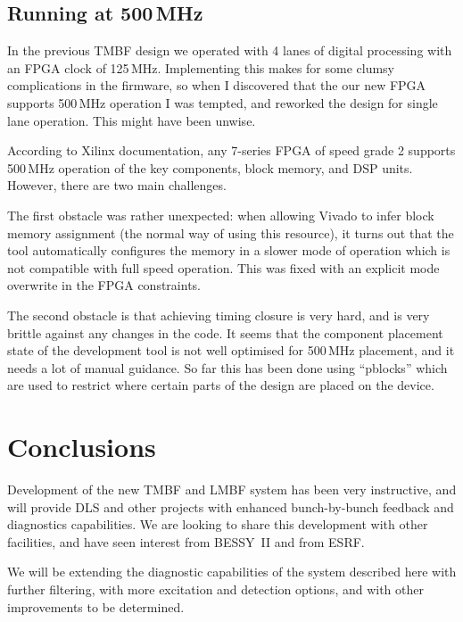 \documentclass[
    a4paper,
    keeplastbox,            %
    hyphens,                %
    nospread,               %
]{jacow-2_1}
\begin{document}
\subsection{Running at 500\,MHz}

In the previous TMBF design we operated with 4 lanes of digital processing with
an FPGA clock of 125\,MHz.  Implementing this makes for some clumsy
complications in the firmware, so when I discovered that the our new FPGA
supports 500\,MHz operation I was tempted, and reworked the design for single
lane operation.  This might have been unwise.

According to Xilinx documentation, any 7-series FPGA of speed grade 2 supports
500\,MHz operation of the key components, block memory, and DSP units.  However,
there are two main challenges.

The first obstacle was rather unexpected: when allowing Vivado to infer block
memory assignment (the normal way of using this resource), it turns out that the
tool automatically configures the memory in a slower mode of operation which is
not compatible with full speed operation.  This was fixed with an explicit mode
overwrite in the FPGA constraints.

The second obstacle is that achieving timing closure is very hard, and is very
brittle against any changes in the code.  It seems that the component placement
state of the development tool is not well optimised for 500\,MHz placement, and
it needs a lot of manual guidance.  So far this has been done using ``pblocks''
which are used to restrict where certain parts of the design are placed on the
device.


\section{Conclusions}

Development of the new TMBF and LMBF system has been very instructive, and will
provide DLS and other projects with enhanced bunch-by-bunch feedback and
diagnostics capabilities.  We are looking to share this development with other
facilities, and have seen interest from BESSY~II and from ESRF.

We will be extending the diagnostic capabilities of the system described here
with further filtering, with more excitation and detection options, and with
other improvements to be determined.
\end{document}
